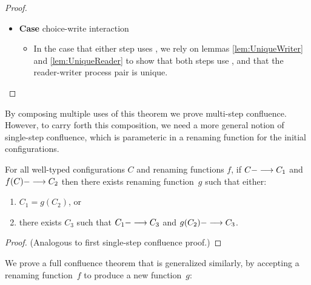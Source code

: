 \begin{theorem}
\begin{proof}
\begin{itemize}[leftmargin=*]
   \item[] \textbf{Case} choice-write interaction 
     \begin{itemize}[leftmargin=*]
       \item[] In the case that either step uses , we rely on lemmas
         \ref{lem:UniqueWriter} and \ref{lem:UniqueReader} to show that both
         steps use , and that the reader-writer process pair is unique.
     \end{itemize}     
   \end{itemize}
\end{proof}
\end{theorem}

By composing multiple uses of this theorem
we prove multi-step confluence.
However, to carry forth this composition, we need a more general
notion of single-step confluence, which is parameteric in a renaming
function for the initial configurations.

\begin{theorem}
For all well-typed configurations $C$ 
and renaming functions $f$,
%
 if $C ---> C_1$ 
and $f(C) ---> C_2$ 
then 
there exists renaming function~$g$ 
such that either:
\begin{enumerate}
\item %
$C_1 = g(C_2)$,
or
\item there exists $C_3$ such that $C_1 ---> C_3$ and $g(C_2) ---> C_3$.
\end{enumerate}
\begin{proof}
  (Analogous to first single-step confluence proof.)
\end{proof}
\end{theorem}

We prove a full confluence theorem that is generalized similarly, by
accepting a renaming function~$f$ to produce a new function~$g$:

